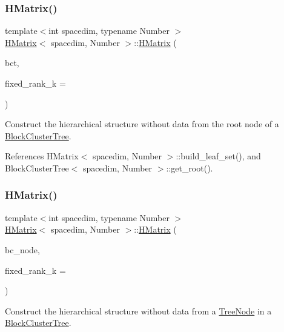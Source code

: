 \subsubsection{\texorpdfstring{H\+Matrix()}{HMatrix()}\hspace{0.1cm}{\footnotesize\ttfamily [2/9]}}
{\footnotesize\ttfamily template$<$int spacedim, typename Number $>$ \\
\hyperlink{classHMatrix}{H\+Matrix}$<$ spacedim, Number $>$\+::\hyperlink{classHMatrix}{H\+Matrix} (\begin{DoxyParamCaption}\item[{const \hyperlink{classBlockClusterTree}{Block\+Cluster\+Tree}$<$ spacedim, Number $>$ \&}]{bct,  }\item[{const unsigned int}]{fixed\+\_\+rank\+\_\+k = {} }\end{DoxyParamCaption})}

Construct the hierarchical structure without data from the root node of a \hyperlink{classBlockClusterTree}{Block\+Cluster\+Tree}. 

References H\+Matrix$<$ spacedim, Number $>$\+::build\+\_\+leaf\+\_\+set(), and Block\+Cluster\+Tree$<$ spacedim, Number $>$\+::get\+\_\+root().

\mbox{\label{classHMatrix_a4fe44a3aa2b813f593b787f24be56a1c}} 
\subsubsection{\texorpdfstring{H\+Matrix()}{HMatrix()}\hspace{0.1cm}{\footnotesize\ttfamily [3/9]}}
{\footnotesize\ttfamily template$<$int spacedim, typename Number $>$ \\
\hyperlink{classHMatrix}{H\+Matrix}$<$ spacedim, Number $>$\+::\hyperlink{classHMatrix}{H\+Matrix} (\begin{DoxyParamCaption}\item[{typename \hyperlink{classBlockClusterTree}{Block\+Cluster\+Tree}$<$ spacedim, Number $>$\+::node\+\_\+const\+\_\+pointer\+\_\+type}]{bc\+\_\+node,  }\item[{const unsigned int}]{fixed\+\_\+rank\+\_\+k = {} }\end{DoxyParamCaption})}

Construct the hierarchical structure without data from a \hyperlink{classTreeNode}{Tree\+Node} in a \hyperlink{classBlockClusterTree}{Block\+Cluster\+Tree}. 


